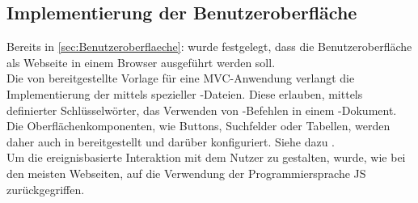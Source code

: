 \subsection{Implementierung der Benutzeroberfläche}
\label{sec:ImplementierungBenutzeroberflaeche}
Bereits in \ref{sec:Benutzeroberflaeche}:  wurde festgelegt, dass die Benutzeroberfläche
als Webseite in einem Browser ausgeführt werden soll.\\
Die von  bereitgestellte Vorlage für eine \ac{MVC}-Anwendung verlangt
die Implementierung der  mittels spezieller -Dateien.
Diese erlauben, mittels definierter Schlüsselwörter, das Verwenden von -Befehlen in einem
-Dokument. Die Oberflächenkomponenten, wie \zB Buttons, Suchfelder oder Tabellen, werden
daher auch in  bereitgestellt und darüber konfiguriert. Siehe dazu .\\
Um die ereignisbasierte Interaktion mit dem Nutzer zu gestalten, wurde, wie bei den meisten Webseiten,
auf die Verwendung der Programmiersprache \acs{JS} zurückgegriffen.

